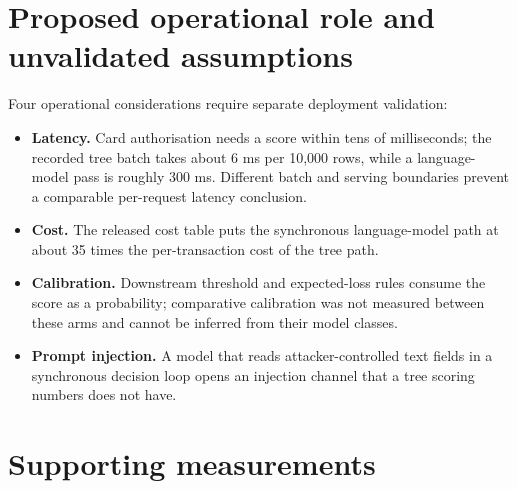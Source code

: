 \documentclass[12pt,a4paper]{report}
\providecommand{\tightlist}{%
  \setlength{\itemsep}{0pt}\setlength{\parskip}{0pt}}
\begin{document}
\section{Proposed operational role and unvalidated
assumptions}\label{proposed-operational-role-and-unvalidated-assumptions}

Four operational considerations require separate deployment validation:

\begin{itemize}
\tightlist
\item
  \textbf{Latency.} Card authorisation needs a score within tens of
  milliseconds; the recorded tree batch takes about 6 ms per 10,000
  rows, while a language-model pass is roughly 300 ms. Different batch
  and serving boundaries prevent a comparable per-request latency
  conclusion.
\item
  \textbf{Cost.} The released cost table puts the synchronous
  language-model path at about 35 times the per-transaction cost of the
  tree path.
\item
  \textbf{Calibration.} Downstream threshold and expected-loss rules
  consume the score as a probability; comparative calibration was not
  measured between these arms and cannot be inferred from their model
  classes.
\item
  \textbf{Prompt injection.} A model that reads attacker-controlled text
  fields in a synchronous decision loop opens an injection channel that
  a tree scoring numbers does not have.
\end{itemize}

\clearpage

\section{Supporting measurements}\label{supporting-measurements}

\begingroup\small
\end{document}
